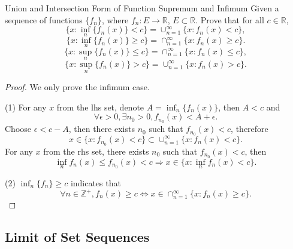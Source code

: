 \begin{example}{Union and Intersection Form of Function Supremum and Infimum}{}
  Given a sequence of functions $\{f_n\}$, where $f_n: E \rightarrow \mathbb{R}$,
  $E \subset \mathbb{R}$. Prove that for all $c \in \mathbb{R}$,
  \begin{equation}
    \{x: \inf_n \{f_n(x)\} < c\} = \cup _{n = 1}^{\infty} \{x: f_n(x) < c\},
  \end{equation}
  \begin{equation}
    \{x: \inf_n \{f_n(x)\} \geq c\} = \cap _{n = 1}^{\infty} \{x: f_n(x) \geq c\}.
  \end{equation}
  \begin{equation}
    \{x: \sup_n \{f_n(x)\} \leq c\} = \cap _{n = 1}^{\infty} \{x: f_n(x) \leq c\},
  \end{equation}
  \begin{equation}
    \{x: \sup_n \{f_n(x)\} > c\} = \cup _{n = 1}^{\infty} \{x: f_n(x) > c\}.
  \end{equation}
\end{example}

\begin{proof}
  We only prove the infimum case.

  (1) For any $x$ from the lhs set, denote $A = \inf_n \{f_n(x)\}$, then
  $A < c$ and
  \begin{equation}
    \forall \epsilon > 0, \exists n_0 > 0,
    f_{n_0}(x) < A + \epsilon.
  \end{equation}
  Choose $\epsilon < c - A$, then there exists $n_0$ such that $f_{n_0}(x) < c$,
  therefore
  \begin{equation}
    x \in \{x: f_{n_0}(x) < c\} \subset \cup _{n = 1}^{\infty} \{x: f_n(x) < c\}.
  \end{equation}
  For any $x$ from the rhs set, there exists $n_0$ such that $f_{n_0}(x) < c$, then
  \begin{equation}
    \inf_n f_n(x) \leq f_{n_0}(x) < c \Rightarrow x \in \{x: \inf_n f_n(x) < c\}.
  \end{equation}

  (2) $\inf_n \{f_n\} \geq c$ indicates that
  \begin{equation}
    \forall n \in \mathbb{Z}^+, f_n(x) \geq c
    \Leftrightarrow x \in \cap_{n = 1}^{\infty} \{x: f_n(x) \geq c\}.
  \end{equation}
\end{proof}

\subsection{Limit of Set Sequences}

